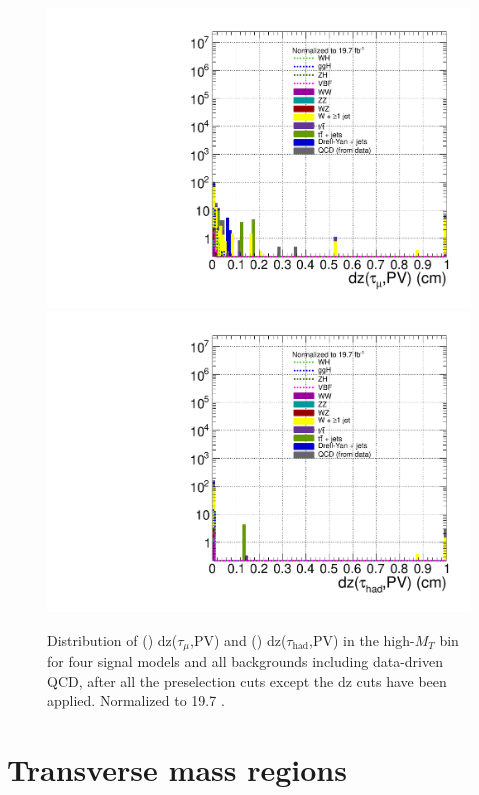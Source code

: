\begin{figure}[hbtp]
  \begin{center}
    \includegraphics[width=1.2\cmsFigWidth]{figures/sigVsBkg_dztaumu_regA_highMT_v60}
    \includegraphics[width=1.2\cmsFigWidth]{figures/sigVsBkg_dztauhad_regA_highMT_v60}
    \caption{Distribution of (\cmsLeft) dz($\tau_{\mu}$,PV) and (\cmsRight) dz($\tau_{\text{had}}$,PV) in the high-$M_{T}$ bin for four signal models and all backgrounds including data-driven QCD, after all the preselection cuts except the dz cuts have been applied. Normalized to 19.7 \fbinv.}
    \label{fig:sigVsBkg_dz_regA_highMT}
  \end{center}
\end{figure}

\section{Transverse mass regions \label{sec:evtsel-mt}}

